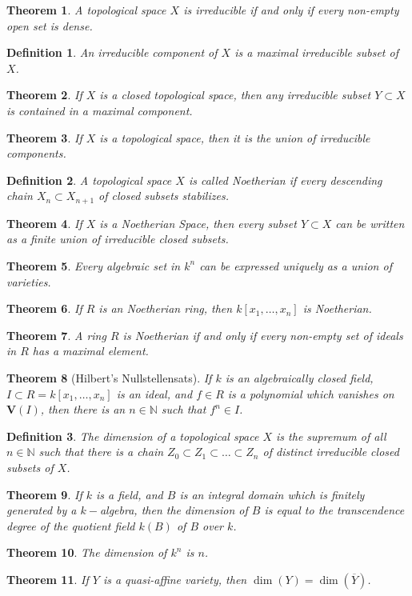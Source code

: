 \documentclass{article}
\theoremstyle{mystyle}
\newtheorem{theorem}{Theorem}[section]
\newtheorem{definition}{Definition}[section]
\begin{document}
\begin{theorem}
A topological space $X$ is irreducible if and only if every non-empty open set is dense.
\end{theorem}
\begin{definition}
An irreducible component of $X$ is a maximal irreducible subset of $X$.
\end{definition}
\begin{theorem}
If $X$ is a closed topological space, then any irreducible subset $Y\subset X$ is contained in a maximal component.
\end{theorem}
\begin{theorem}
If $X$ is a topological space, then it is the union of irreducible components.
\end{theorem}
\begin{definition}
A topological space $X$ is called Noetherian if every descending chain $X_n \subset X_{n+1}$ of closed subsets stabilizes.
\end{definition}
\begin{theorem}
If $X$ is a Noetherian Space, then every subset $Y\subset X$ can be written as a finite union of irreducible closed subsets.
\end{theorem}
\begin{theorem}
Every algebraic set in $k^n$ can be expressed uniquely as a union of varieties.
\end{theorem}
\begin{theorem}
If $R$ is an Noetherian ring, then $k[x_1,\hdots ,x_n]$ is Noetherian.
\end{theorem}
\begin{theorem}
A ring $R$ is Noetherian if and only if every non-empty set of ideals in $R$ has a maximal element.
\end{theorem}
\begin{theorem}[Hilbert's Nullstellensats]
If $k$ is an algebraically closed field, $I\subset R = k[x_1,\hdots ,x_n]$ is an ideal, and $f\in R$ is a polynomial which vanishes on $\mathbf{V}(I)$, then there is an $n\in \mathbb{N}$ such that $f^n \in I$.
\end{theorem}
\begin{definition}
The dimension of a topological space $X$ is the supremum of all $n\in \mathbb{N}$ such that there is a chain $Z_0\subset Z_1\subset \hdots \subset Z_n$ of distinct irreducible closed subsets of $X$.
\end{definition}
\begin{theorem}
If $k$ is a field, and $B$ is an integral domain which is finitely generated by a $k-$algebra, then the dimension of $B$ is equal to the transcendence degree of the quotient field $k(B)$ of $B$ over $k$.
\end{theorem}
\begin{theorem}
The dimension of $k^n$ is $n$.
\end{theorem}
\begin{theorem}
If $Y$ is a quasi-affine variety, then $\dim(Y) = \dim(\overline{Y})$.
\end{theorem}
\end{document}
